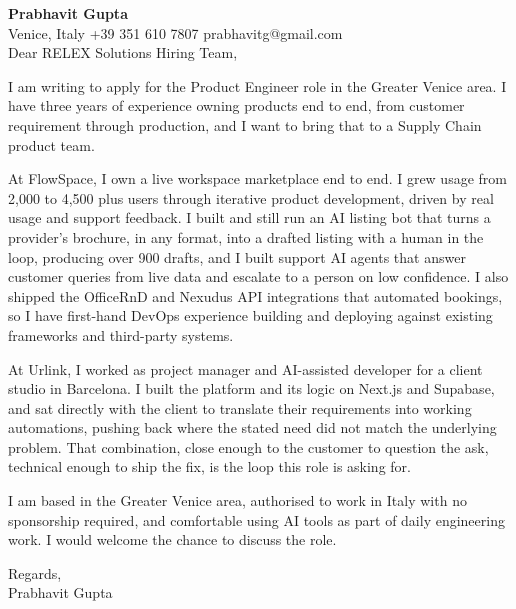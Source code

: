 \documentclass[a4paper,10.5pt]{article}
\begin{document}
\textbf{Prabhavit Gupta}\\
Venice, Italy \textbar{} +39 351 610 7807 \textbar{} prabhavitg@gmail.com\\[10pt]
Dear RELEX Solutions Hiring Team,

I am writing to apply for the Product Engineer role in the Greater Venice area. I have three years of experience owning products end to end, from customer requirement through production, and I want to bring that to a Supply Chain product team.

At FlowSpace, I own a live workspace marketplace end to end. I grew usage from 2,000 to 4,500 plus users through iterative product development, driven by real usage and support feedback. I built and still run an AI listing bot that turns a provider's brochure, in any format, into a drafted listing with a human in the loop, producing over 900 drafts, and I built support AI agents that answer customer queries from live data and escalate to a person on low confidence. I also shipped the OfficeRnD and Nexudus API integrations that automated bookings, so I have first-hand DevOps experience building and deploying against existing frameworks and third-party systems.

At Urlink, I worked as project manager and AI-assisted developer for a client studio in Barcelona. I built the platform and its logic on Next.js and Supabase, and sat directly with the client to translate their requirements into working automations, pushing back where the stated need did not match the underlying problem. That combination, close enough to the customer to question the ask, technical enough to ship the fix, is the loop this role is asking for.

I am based in the Greater Venice area, authorised to work in Italy with no sponsorship required, and comfortable using AI tools as part of daily engineering work. I would welcome the chance to discuss the role.

Regards,\\
Prabhavit Gupta
\end{document}
